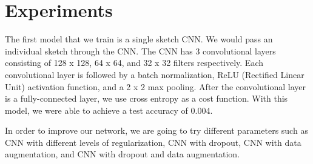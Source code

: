 \documentclass[10pt,twocolumn,letterpaper]{article}
\begin{document}
\section{Experiments}
The first model that we train is a single sketch CNN. We would pass an individual sketch through the CNN. The CNN has 3 convolutional layers consisting of 128 x 128, 64 x 64, and 32 x 32 filters respectively. Each convolutional layer is followed by a batch normalization, ReLU (Rectified Linear Unit) activation function, and a 2 x 2 max pooling. After the convolutional layer is a fully-connected layer, we use cross  entropy as a cost function. With this model, we were able to achieve a test accuracy of 0.004. 

In order to improve our network, we are going to try different parameters such as CNN with different levels of regularization, CNN with dropout, CNN with data augmentation, and CNN with dropout and data augmentation. 

{\small


}
\end{document}
